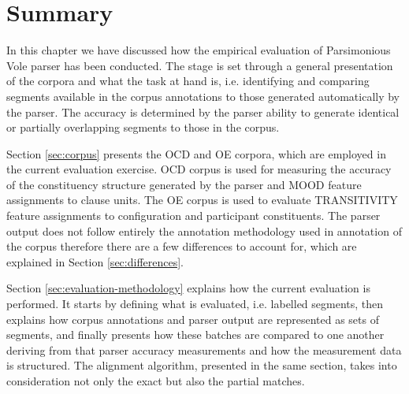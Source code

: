     
    

\section{Summary}
\label{sec:evaluation-discussion}
    
    In this chapter we have discussed how the empirical evaluation of Parsimonious Vole parser has been conducted. The stage is set through a general presentation of the corpora and what the task at hand is, i.e. identifying and comparing segments available in the corpus annotations to those generated automatically by the parser. The accuracy is determined by the parser ability to generate identical or partially overlapping segments to those in the corpus.
    
    Section \ref{sec:corpus} presents the OCD and OE corpora, which are employed in the current evaluation exercise. OCD corpus is used for measuring the accuracy of the constituency structure generated by the parser and MOOD feature assignments to clause units. The OE corpus is used to evaluate TRANSITIVITY feature assignments to configuration and participant constituents. The parser output does not follow entirely the annotation methodology used in annotation of the corpus therefore there are a few differences to account for, which are explained in Section \ref{sec:differences}. 
    
    Section \ref{sec:evaluation-methodology} explains how the current evaluation is performed. It starts by defining what is evaluated, i.e. labelled segments, then explains how corpus annotations and parser output are represented as sets of segments, and finally presents how these batches are compared to one another deriving from that parser accuracy measurements and how the measurement data is structured. The alignment algorithm, presented in the same section, takes into consideration not only the exact but also the partial matches. %
    
